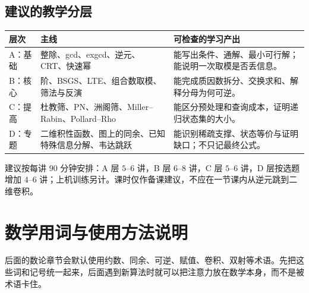 \documentclass[UTF8,a4paper,11pt,twoside,openright,fontset=fandol]{ctexbook}
\theoremstyle{definition}
\begin{document}
\section*{建议的教学分层}
\begin{longtable}{p{}p{}p{}}
\toprule
层次 & 主线 & 可检查的学习产出\\\midrule
A：基础 & 整除、gcd、exgcd、逆元、CRT、快速幂 & 能写出条件、通解、最小可行解；能说明一次取模是否丢信息。\\
B：核心 & 阶、BSGS、LTE、组合数取模、筛法与反演 & 能完成质因数拆分、交换求和、解释分母为何可逆。\\
C：提高 & 杜教筛、PN、洲阁筛、Miller--Rabin、Pollard--Rho & 能区分预处理和查询成本，证明递归状态集的大小。\\
D：专题 & 二维积性函数、图上的同余、已知特殊信息分解、韦达跳跃 & 能识别稀疏支撑、状态等价与证明缺口；不只记最终公式。\\
\bottomrule
\end{longtable}

建议按每讲 $90$ 分钟安排：A 层 $5$--$6$ 讲，B 层 $6$--$8$ 讲，C 层 $5$--$6$ 讲，D 层按选题增加 $4$--$6$ 讲；上机训练另计。课时仅作备课建议，不应在一节课内从逆元跳到二维卷积。




\tableofcontents
\mainmatter
\setcounter{chapter}{-1}
\chapter{数学用词与使用方法说明}
\begin{chapterintro}[章节导读]
后面的数论章节会默认使用约数、同余、可逆、赋值、卷积、双射等术语。先把这些词和记号统一起来，后面遇到新算法时就可以把注意力放在数学本身，而不是被术语卡住。
\end{chapterintro}
\end{document}
